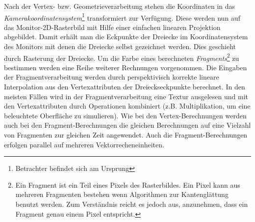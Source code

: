 \documentclass[twoside,a4paper,fleqn,12pt]{book}
\begin{document}
Nach der Vertex- bzw. Geometrieverarbeitung stehen die Koordinaten in das \emph{Kamerakoordinatensystem}\footnote{Betrachter befindet sich am
Ursprung} transformiert zur Verfügung. Diese werden nun auf das Monitor-2D-Rasterbild mit Hilfe einer einfachen linearen Projektion
abgebildet. Damit erhält man die Eckpunkte der Dreiecke im Koordinatensystem des Monitors mit denen die Dreiecke selbst
gezeichnet werden. Dies geschieht durch Rasterung der Dreiecke. Um die Farbe eines berechneten 
\emph{Fragments}\footnote{Ein Fragment ist ein Teil eines Pixels des Rasterbildes. Ein Pixel kann aus mehreren Fragmenten bestehen wenn 
Algorithmen zur Kantenglättung benutzt werden. Zum Verständnis reicht es jedoch aus, anzunehmen, dass ein Fragment genau einem Pixel entspricht.} zu 
bestimmen werden eine Reihe weiterer Rechnungen vorgenommen. Die Eingaben der Fragmentverarbeitung werden
durch perspektivisch korrekte lineare Interpolation aus den Vertexattributen der Drei\-ecks\-eck\-punk\-te  
berechnet. In den meisten Fällen wird in der Fragmentverarbeitung eine Textur ausgelesen
und mit den Vertexattributen durch Operationen kombiniert (z.B. Multiplikation, um eine beleuchtete Oberfläche zu simulieren).
Wie bei den Vertex-Berechnungen werden auch bei den Fragment-Berechnungen die gleichen Berechnungen auf eine Vielzahl
von Fragmenten zur gleichen Zeit angewendet. Auch die Fragment-Berechnungen erfolgen parallel auf mehreren Vektorrecheneinheiten.
\end{document}
